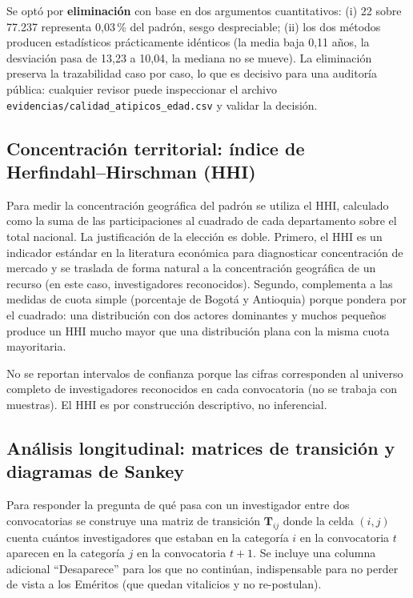 \documentclass[11pt,a4paper,oneside]{article}
\begin{document}
Se optó por \textbf{eliminación} con base en dos argumentos cuantitativos: (i) 22 sobre 77.237 representa 0{,}03\,\% del padrón, sesgo despreciable; (ii) los dos métodos producen estadísticos prácticamente idénticos (la media baja 0{,}11 años, la desviación pasa de 13{,}23 a 10{,}04, la mediana no se mueve). La eliminación preserva la trazabilidad caso por caso, lo que es decisivo para una auditoría pública: cualquier revisor puede inspeccionar el archivo \texttt{evidencias/calidad\_atipicos\_edad.csv} y validar la decisión.

\subsection{Concentración territorial: índice de Herfindahl--Hirschman (HHI)}

Para medir la concentración geográfica del padrón se utiliza el HHI, calculado como la suma de las participaciones al cuadrado de cada departamento sobre el total nacional. La justificación de la elección es doble. Primero, el HHI es un indicador estándar en la literatura económica para diagnosticar concentración de mercado y se traslada de forma natural a la concentración geográfica de un recurso (en este caso, investigadores reconocidos). Segundo, complementa a las medidas de cuota simple (porcentaje de Bogotá y Antioquia) porque pondera por el cuadrado: una distribución con dos actores dominantes y muchos pequeños produce un HHI mucho mayor que una distribución plana con la misma cuota mayoritaria.

No se reportan intervalos de confianza porque las cifras corresponden al universo completo de investigadores reconocidos en cada convocatoria (no se trabaja con muestras). El HHI es por construcción descriptivo, no inferencial.

\subsection{Análisis longitudinal: matrices de transición y diagramas de Sankey}

Para responder la pregunta de qué pasa con un investigador entre dos convocatorias se construye una matriz de transición $\mathbf{T}_{ij}$ donde la celda $(i,j)$ cuenta cuántos investigadores que estaban en la categoría $i$ en la convocatoria $t$ aparecen en la categoría $j$ en la convocatoria $t+1$. Se incluye una columna adicional ``Desaparece'' para los que no continúan, indispensable para no perder de vista a los Eméritos (que quedan vitalicios y no re-postulan).
\end{document}
